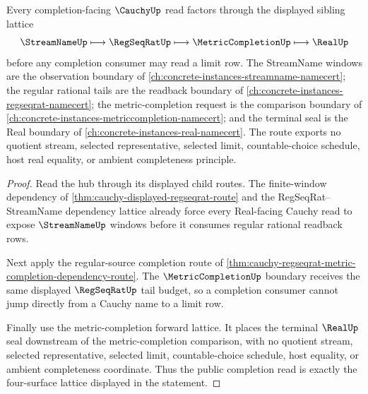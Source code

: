 \begin{theorem}
\label{thm:cauchy-regseqrat-real-completion-lattice}
Every completion-facing $\CauchyUp$ read factors through the displayed sibling lattice
$$
\StreamNameUp \longmapsto \RegSeqRatUp \longmapsto \MetricCompletionUp \longmapsto \RealUp
$$
before any completion consumer may read a limit row. The StreamName windows are the observation boundary of \autoref{ch:concrete-instances-streamname-namecert}; the regular rational tails are the readback boundary of \autoref{ch:concrete-instances-regseqrat-namecert}; the metric-completion request is the comparison boundary of \autoref{ch:concrete-instances-metriccompletion-namecert}; and the terminal seal is the Real boundary of \autoref{ch:concrete-instances-real-namecert}. The route exports no quotient stream, selected representative, selected limit, countable-choice schedule, host real equality, or ambient completeness principle.
\end{theorem}
\begin{proof}
Read the hub through its displayed child routes. The finite-window dependency of \autoref{thm:cauchy-displayed-regseqrat-route} and the RegSeqRat--StreamName dependency lattice already force every Real-facing Cauchy read to expose $\StreamNameUp$ windows before it consumes regular rational readback rows.

Next apply the regular-source completion route of \autoref{thm:cauchy-regseqrat-metric-completion-dependency-route}. The $\MetricCompletionUp$ boundary receives the same displayed $\RegSeqRatUp$ tail budget, so a completion consumer cannot jump directly from a Cauchy name to a limit row.

Finally use the metric-completion forward lattice. It places the terminal $\RealUp$ seal downstream of the metric-completion comparison, with no quotient stream, selected representative, selected limit, countable-choice schedule, host equality, or ambient completeness coordinate. Thus the public completion read is exactly the four-surface lattice displayed in the statement.
\end{proof}
